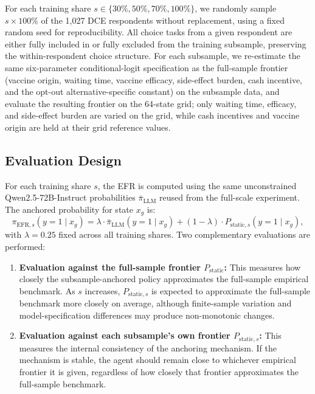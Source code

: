 \documentclass[11pt]{article}
\begin{document}
For each training share $s \in \{30\%, 50\%, 70\%, 100\%\}$, we randomly sample $s \times 100\%$ of the 1{,}027 DCE respondents without replacement, using a fixed random seed for reproducibility. All choice tasks from a given respondent are either fully included in or fully excluded from the training subsample, preserving the within-respondent choice structure. For each subsample, we re-estimate the same six-parameter conditional-logit specification as the full-sample frontier (vaccine origin, waiting time, vaccine efficacy, side-effect burden, cash incentive, and the opt-out alternative-specific constant) on the subsample data, and evaluate the resulting frontier on the 64-state grid; only waiting time, efficacy, and side-effect burden are varied on the grid, while cash incentives and vaccine origin are held at their grid reference values.

\subsection{Evaluation Design}
\label{app:evaluation_design}

For each training share \(s\), the EFR is computed using the same unconstrained Qwen2.5-72B-Instruct probabilities \(\bar{\pi}_{\mathrm{LLM}}\) reused from the full-scale experiment. The anchored probability for state \(x_g\) is:
\[
\pi_{\mathrm{EFR},s}(y=1 \mid x_g)
=
\lambda \cdot \bar{\pi}_{\mathrm{LLM}}(y=1 \mid x_g)
+
(1-\lambda) \cdot P_{\mathrm{static},s}(y=1 \mid x_g),
\]
with \(\lambda = 0.25\) fixed across all training shares. Two complementary evaluations are performed:

\begin{enumerate}
    \item \textbf{Evaluation against the full-sample frontier \(P_{\mathrm{static}}\):} This measures how closely the subsample-anchored policy approximates the full-sample empirical benchmark. As \(s\) increases, \(P_{\mathrm{static},s}\) is expected to approximate the full-sample benchmark more closely on average, although finite-sample variation and model-specification differences may produce non-monotonic changes.

    \item \textbf{Evaluation against each subsample's own frontier \(P_{\mathrm{static},s}\):} This measures the internal consistency of the anchoring mechanism. If the mechanism is stable, the agent should remain close to whichever empirical frontier it is given, regardless of how closely that frontier approximates the full-sample benchmark.
\end{enumerate}
\end{document}
